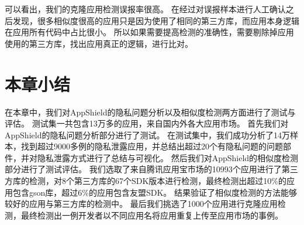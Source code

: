可以看出，我们的克隆应用检测误报率很高。
在经过对误报样本进行人工确认之后发现，很多相似度很高的应用只是因为使用了相同的第三方库，而应用本身逻辑在应用所有代码中占比很小。
所以如果需要提高检测的准确性，需要剔除掉应用使用的第三方库，找出应用真正的逻辑，进行比对。

\section{本章小结}
\label{sec:eval:conclusion}

在本章中，我们对AppShield的隐私问题分析以及相似度检测两方面进行了测试与评估。
测试集一共包含13万多的应用，来自国内外各大应用市场。
首先我们对AppShield的隐私问题分析部分进行了测试。
在测试集中，我们成功分析了14万样本，找到超过9000多例的隐私泄露应用，并总结出超过20个有隐私问题的问题部件，并对隐私泄露方式进行了总结与可视化。
然后我们对AppShield的相似度检测部分进行了测试评估。
我们选取了来自腾讯应用宝市场的10993个应用进行了第三方库的检测，对8个第三方库的67个SDK版本进行检测，最终检测出超过10\%的应用包含gson库，超过6\%的应用包含友盟SDK。
结果验证了相似度检测的方法能够较好的应用与第三方库的检测中。
最后我们挑选了1000个应用进行克隆应用检测，最终检测出一例开发者以不同应用名将应用重复上传至应用市场的事例。